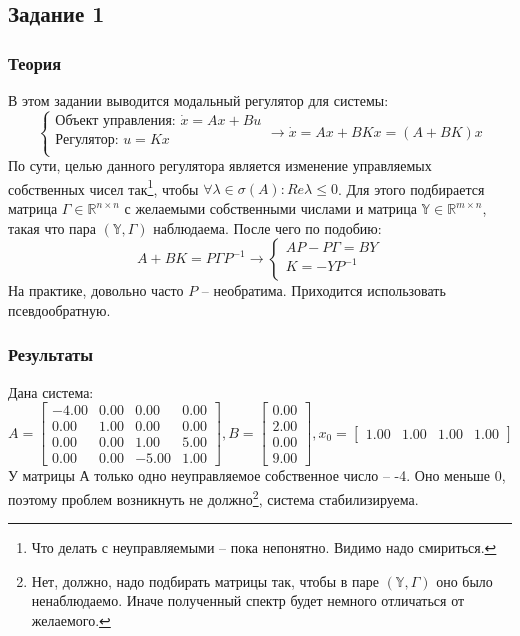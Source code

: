 \subsection{Задание 1}
\subsubsection{Теория}
В этом задании выводится модальный регулятор для системы:
\[
        \begin{cases}
                \text{Объект управления: }\dot{x} = A x + Bu \\
                \text{Регулятор: }u = K x \\
        \end{cases} \rightarrow
        \dot{x} = A x + BKx = (A+BK)x
\]
По сути, целью данного регулятора является изменение управляемых собственных чисел так\footnote{Что делать с неуправляемыми -- пока непонятно. Видимо надо смириться.}, чтобы \(\forall \lambda \in \sigma(A): Re{\lambda} \leq 0\). Для этого подбирается матрица \(\Gamma \in \mathds{R}^{n \times n}\) с желаемыми собственными числами и матрица \(\mathds{Y} \in \mathds{R}^{m \times n}\), такая что пара \((\mathds{Y}, \Gamma)\) наблюдаема. После чего по подобию:
\[A+BK = P \Gamma P^{-1} \rightarrow
        \begin{cases}
                AP - P\Gamma = BY \\
                K = -YP^{-1} \\
        \end{cases}
\]
На практике, довольно часто \(P\) -- необратима. Приходится использовать псевдообратную.

\subsubsection{Результаты}
Дана система:
\[A = \begin{bmatrix}
        -4.00 &  0.00 &  0.00 &  0.00\\
         0.00 &  1.00 &  0.00 &  0.00\\
         0.00 &  0.00 &  1.00 &  5.00\\
         0.00 &  0.00 & -5.00 &  1.00
       \end{bmatrix},
       B = \begin{bmatrix}
        0.00\\
        2.00\\
        0.00\\
        9.00
      \end{bmatrix},
      x_0 = \begin{bmatrix}
        1.00 &  1.00 &  1.00 &  1.00
      \end{bmatrix}
       \]
У матрицы А только одно неуправляемое собственное число -- -4. Оно меньше 0, поэтому проблем возникнуть не должно\footnote{Нет, должно, надо подбирать матрицы так, чтобы в паре \((\mathds{Y}, \Gamma)\) оно было ненаблюдаемо. Иначе полученный спектр будет немного отличаться от желаемого.}, система стабилизируема.

